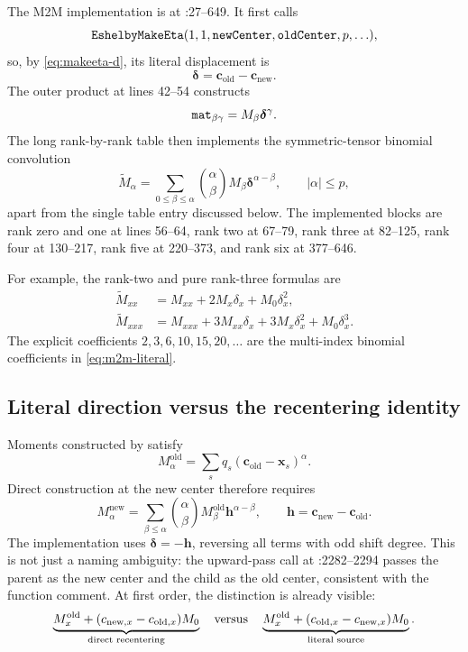 \documentclass[11pt]{article}
\newcommand{\vect}[1]{\bm{#1}}
\newcommand{\abs}[1]{\left\lvert #1\right\rvert}
\newcommand{\code}[1]{\texttt{\detokenize{#1}}}
\begin{document}
The M2M implementation is at :27--649.  It
first calls
\[
\code{EshelbyMakeEta}(1,1,\code{newCenter},\code{oldCenter},p,\ldots),
\]
so, by \eqref{eq:makeeta-d}, its literal displacement is
\begin{equation}
\vect{\delta}=\vect{c}_{\mathrm{old}}-\vect{c}_{\mathrm{new}}.
\label{eq:literal-shift}
\end{equation}
The outer product at lines 42--54 constructs
\[
\code{mat}_{\beta\gamma}=M_\beta\vect{\delta}^{\gamma}.
\]
The long rank-by-rank table then implements the symmetric-tensor binomial
convolution
\begin{equation}
\boxed{
\widetilde M_\alpha
=\sum_{0\leq\beta\leq\alpha}
  \binom{\alpha}{\beta}
  M_\beta\vect{\delta}^{\alpha-\beta},
\qquad \abs{\alpha}\leq p,
}
\label{eq:m2m-literal}
\end{equation}
apart from the single table entry discussed below.  The implemented blocks are
rank zero and one at lines 56--64, rank two at 67--79, rank three at 82--125,
rank four at 130--217, rank five at 220--373, and rank six at 377--646.

For example, the rank-two and pure rank-three formulas are
\begin{align*}
\widetilde M_{xx}
&=M_{xx}+2M_x\delta_x+M_0\delta_x^2,\\
\widetilde M_{xxx}
&=M_{xxx}+3M_{xx}\delta_x+3M_x\delta_x^2+M_0\delta_x^3.
\end{align*}
The explicit coefficients \(2,3,6,10,15,20,\ldots\) are the multi-index
binomial coefficients in \eqref{eq:m2m-literal}.

\subsection{Literal direction versus the recentering identity}

Moments constructed by \code{EshelbyMakeEta} satisfy
\[
M_\alpha^{\mathrm{old}}
=\sum_s q_s(\vect{c}_{\mathrm{old}}-\vect{x}_s)^\alpha.
\]
Direct construction at the new center therefore requires
\begin{equation}
M_\alpha^{\mathrm{new}}
=\sum_{\beta\leq\alpha}\binom{\alpha}{\beta}
 M_\beta^{\mathrm{old}}
 \vect{h}^{\alpha-\beta},
\qquad
\vect{h}=\vect{c}_{\mathrm{new}}-\vect{c}_{\mathrm{old}}.
\label{eq:m2m-intended}
\end{equation}
The implementation uses \(\vect{\delta}=-\vect{h}\), reversing all terms
with odd shift degree.  This is not just a naming ambiguity: the upward-pass
call at :2282--2294 passes the parent as the new center and
the child as the old center, consistent with the function comment.  At first
order, the distinction is already visible:
\[
\underbrace{M_x^{\mathrm{old}}+(c_{\mathrm{new},x}-c_{\mathrm{old},x})M_0}
_{\text{direct recentering}}
\quad\hbox{versus}\quad
\underbrace{M_x^{\mathrm{old}}+(c_{\mathrm{old},x}-c_{\mathrm{new},x})M_0}
_{\text{literal source}}.
\]
\end{document}
